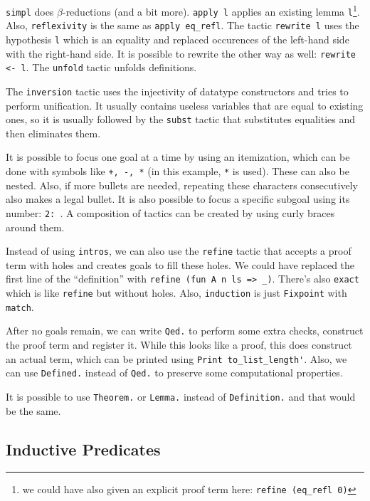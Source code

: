 \lstinline{simpl} does $\beta$-reductions (and a bit more). \lstinline{apply l} applies
an existing lemma \lstinline{l}\footnote{we could have also given an explicit proof term here: \lstinline{refine (eq_refl 0)}}. Also,
\lstinline{reflexivity} is the same as \lstinline{apply eq_refl}.
The tactic \lstinline{rewrite l} uses the hypothesis \lstinline{l} which is an equality and replaced occurences of the left-hand
side with the right-hand side. It is possible to rewrite the other way as well: \lstinline{rewrite <- l}.
The \lstinline{unfold} tactic unfolds definitions.

The \lstinline{inversion} tactic uses the injectivity of datatype constructors and tries to perform unification. It usually
contains useless variables that are equal to existing ones, so it is usually followed by the \lstinline{subst} tactic that substitutes
equalities and then eliminates them. 

It is possible to focus one goal at a time by using an itemization, which can be done with symbols like \lstinline{+, -, *} (in this example,
\lstinline{*} is used). These can also be nested. Also, if more bullets are needed, repeating these characters consecutively also makes a 
legal bullet. It is also possible to focus a specific subgoal using its number: \lstinline{2: }. A composition of tactics
can be created by using curly braces around them.

Instead of using \lstinline{intros}, we can also use the \lstinline{refine} tactic that accepts a proof term with holes and 
creates goals to fill these holes. We could have replaced the first line of the ``definition'' with \lstinline{refine (fun A n ls => _)}. 
There's also \lstinline{exact} which is like \lstinline{refine} but without holes.
Also, \lstinline{induction} is just \lstinline{Fixpoint} with \lstinline{match}.

After no goals remain, we can write \lstinline{Qed.} to perform some extra checks, construct the proof term and register it.
While this looks like a proof, this does construct an actual term, which can be printed using \lstinline{Print to_list_length'}.
Also, we can use \lstinline{Defined.} instead of \lstinline{Qed.} to preserve some computational properties.

It is possible to use \lstinline{Theorem.} or \lstinline{Lemma.} instead of \lstinline{Definition.} and that would be the same.

\subsection{Inductive Predicates}

